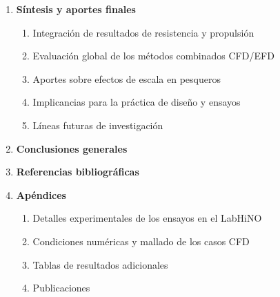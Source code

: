 \begin{enumerate}
  \item \textbf{Síntesis y aportes finales}
  \begin{enumerate}[label*=\arabic*.]
    \item Integración de resultados de resistencia y propulsión
    \item Evaluación global de los métodos combinados CFD/EFD
    \item Aportes sobre efectos de escala en pesqueros
    \item Implicancias para la práctica de diseño y ensayos
    \item Líneas futuras de investigación
  \end{enumerate}

  \item \textbf{Conclusiones generales}

  \item \textbf{Referencias bibliográficas}

  \item \textbf{Apéndices}
  \begin{enumerate}[label*=\Alph*.]
    \item Detalles experimentales de los ensayos en el LabHiNO
    \item Condiciones numéricas y mallado de los casos CFD
    \item Tablas de resultados adicionales
    \item Publicaciones
  \end{enumerate}
\end{enumerate}